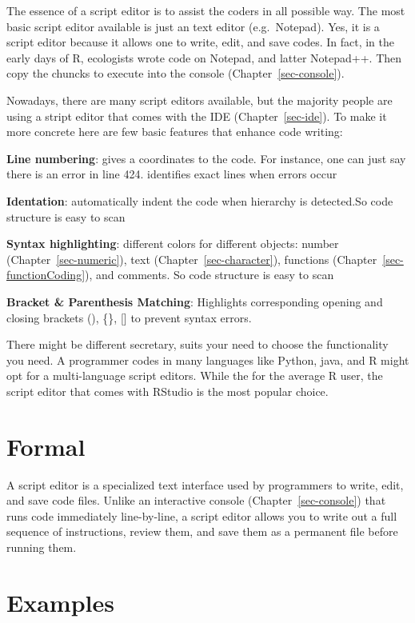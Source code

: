 \documentclass[
  letterpaper,
  DIV=11,
  numbers=noendperiod]{scrreprt}
\begin{document}
The essence of a script editor is to assist the coders in all possible
way. The most basic script editor available is just an text editor
(e.g.~Notepad). Yes, it is a script editor because it allows one to
write, edit, and save codes. In fact, in the early days of R, ecologists
wrote code on Notepad, and latter Notepad++. Then copy the chuncks to
execute into the console (Chapter~\ref{sec-console}).

Nowadays, there are many script editors available, but the majority
people are using a stript editor that comes with the IDE
(Chapter~\ref{sec-ide}). To make it more concrete here are few basic
features that enhance code writing:

\textbf{Line numbering}: gives a coordinates to the code. For instance,
one can just say there is an error in line 424. identifies exact lines
when errors occur

\textbf{Identation}: automatically indent the code when hierarchy is
detected.So code structure is easy to scan

\textbf{Syntax highlighting}: different colors for different objects:
number (Chapter~\ref{sec-numeric}), text (Chapter~\ref{sec-character}),
functions (Chapter~\ref{sec-functionCoding}), and comments. So code
structure is easy to scan

\textbf{Bracket \& Parenthesis Matching}: Highlights corresponding
opening and closing brackets (), \{\}, {[}{]} to prevent syntax errors.

There might be different secretary, suits your need to choose the
functionality you need. A programmer codes in many languages like
Python, java, and R might opt for a multi-language script editors. While
the for the average R user, the script editor that comes with RStudio is
the most popular choice.

\section*{Formal}\label{formal-26}


A script editor is a specialized text interface used by programmers to
write, edit, and save code files. Unlike an interactive console
(Chapter~\ref{sec-console}) that runs code immediately line-by-line, a
script editor allows you to write out a full sequence of instructions,
review them, and save them as a permanent file before running them.

\section*{Examples}\label{examples-25}
\end{document}
